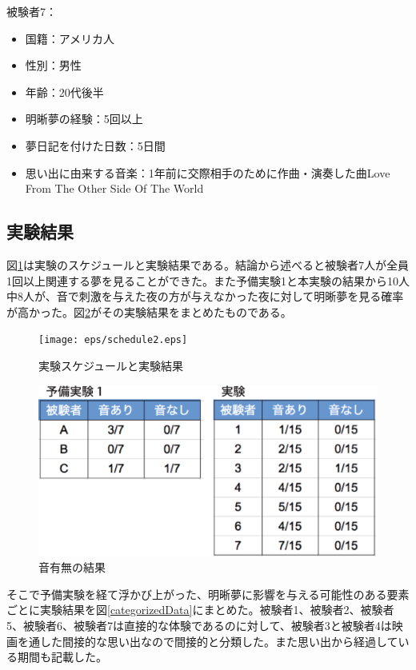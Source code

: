 被験者7：
\begin{itemize}
\item 国籍：アメリカ人
\item 性別：男性
\item 年齢：20代後半
\item 明晰夢の経験：5回以上
\item 夢日記を付けた日数：5日間
\item 思い出に由来する音楽：1年前に交際相手のために作曲・演奏した曲Love From The Other Side Of The World\end{itemize}

\subsection{実験結果}
図\ref{experiment3}は実験のスケジュールと実験結果である。結論から述べると被験者7人が全員1回以上関連する夢を見ることができた。また予備実験1と本実験の結果から10人中8人が、音で刺激を与えた夜の方が与えなかった夜に対して明晰夢を見る確率が高かった。図\ref{musciOnNo}がその実験結果をまとめたものである。

\begin{figure}[htbp]
\begin{center}
\texttt{[image: eps/schedule2.eps]}
\caption{実験スケジュールと実験結果}
\label{experiment3}
\end{center}
\end{figure}

\begin{figure}[htbp]
\begin{center}
\includegraphics[width=13cm]{eps/musicOnNO.eps}
\caption{音有無の結果}
\label{musciOnNo}
\end{center}
\end{figure}

そこで予備実験を経て浮かび上がった、明晰夢に影響を与える可能性のある要素ごとに実験結果を図\ref{categorizedData}にまとめた。被験者1、被験者2、被験者5、被験者6、被験者7は直接的な体験であるのに対して、被験者3と被験者4は映画を通した間接的な思い出なので間接的と分類した。また思い出から経過している期間も記載した。

